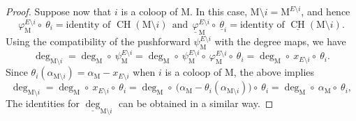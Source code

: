 \documentclass[11pt,reqno]{amsart}
\theoremstyle{definition}
\theoremstyle{remark}
\renewcommand{\(}{\left(}
\renewcommand{\)}{\right)}
\newcommand{\<}{\left<}
\renewcommand{\>}{\right>}
\renewcommand{\and}{\qquad\text{and}\qquad}
\newcommand{\CH}{\operatorname{CH}}
\begin{document}
\begin{proof}
Suppose now that $i$ is a coloop of $\mathrm{M}$. 
In this case, %
$\mathrm{M} \setminus i=\mathrm{M}^{E \setminus i}$,
and hence
\[
\varphi^{E \setminus i}_\mathrm{M} \circ \ \theta_i=\text{identity of $\CH(\mathrm{M} \setminus i)$}
\ \ \text{and} \ \ 
\underline{\varphi}^{E \setminus i}_\mathrm{M} \circ \ \underline{\theta}_i=\text{identity of $\underline{\CH}(\mathrm{M} \setminus i)$}.
\]
Using the compatibility of the pushforward $\psi^{E\setminus i}_\mathrm{M}$ with the degree maps,  we have
\[
\deg_{\mathrm{M} \setminus i}
=\deg_\mathrm{M} \circ\ \psi^{E \setminus i}_\mathrm{M} 
=\deg_\mathrm{M} \circ\ \psi^{E \setminus i}_\mathrm{M} \circ \ \varphi^{E \setminus i}_\mathrm{M} \circ \ \theta_i
=\deg_{\mathrm{M}} \circ\ x_{E \setminus i} \circ\ \theta_i.
\]
Since  $\theta_i(\alpha_{\mathrm{M} \setminus i})=\alpha_\mathrm{M}-x_{E \setminus i}$  when $i$ is a coloop of $\mathrm{M}$, the above implies
\[
\deg_{\mathrm{M} \setminus i}
=\deg_{\mathrm{M}} \circ\ x_{E \setminus i} \circ\ \theta_i
=\deg_{\mathrm{M}} \circ\ \big(\alpha_\mathrm{M} -\theta_i (\alpha_{\mathrm{M} \setminus i})\big) \circ\ \theta_i
=\deg_{\mathrm{M}} \circ\ \alpha_\mathrm{M} \circ\ \theta_i,
\]
The identities for $\underline{\deg}_{\mathrm{M} \setminus i}$ can be obtained in a similar way. 
\end{proof}
\end{document}
